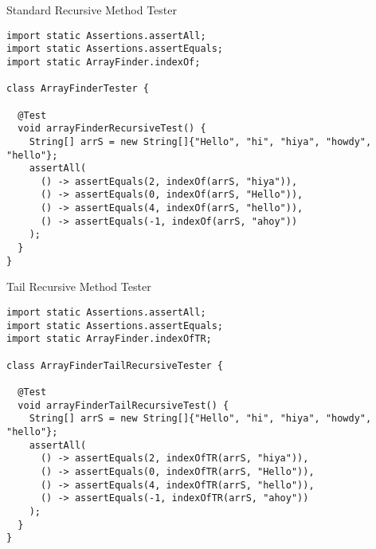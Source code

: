 
\begin{cl}{Standard Recursive  Method Tester}
\begin{lstlisting}[language=MyJava]
import static Assertions.assertAll;
import static Assertions.assertEquals;
import static ArrayFinder.indexOf;

class ArrayFinderTester {

  @Test
  void arrayFinderRecursiveTest() {
    String[] arrS = new String[]{"Hello", "hi", "hiya", "howdy", "hello"};
    assertAll(
      () -> assertEquals(2, indexOf(arrS, "hiya")),
      () -> assertEquals(0, indexOf(arrS, "Hello")),
      () -> assertEquals(4, indexOf(arrS, "hello")),
      () -> assertEquals(-1, indexOf(arrS, "ahoy"))
    );
  }
}
\end{lstlisting}
\end{cl}

\begin{cl}{Tail Recursive  Method Tester}
\begin{lstlisting}[language=MyJava]
import static Assertions.assertAll;
import static Assertions.assertEquals;
import static ArrayFinder.indexOfTR;

class ArrayFinderTailRecursiveTester {

  @Test
  void arrayFinderTailRecursiveTest() {
    String[] arrS = new String[]{"Hello", "hi", "hiya", "howdy", "hello"};
    assertAll(
      () -> assertEquals(2, indexOfTR(arrS, "hiya")),
      () -> assertEquals(0, indexOfTR(arrS, "Hello")),
      () -> assertEquals(4, indexOfTR(arrS, "hello")),
      () -> assertEquals(-1, indexOfTR(arrS, "ahoy"))
    );
  }
}
\end{lstlisting}
\end{cl}

